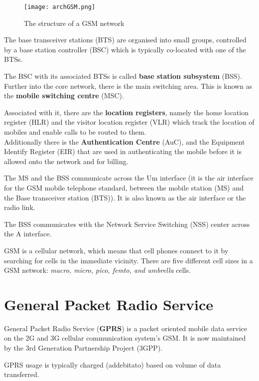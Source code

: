 \begin{figure}[H]
  \centering
  \texttt{[image: archGSM.png]}
  \caption{The structure of a GSM network}
  \label{fig:archGSM}
\end{figure}

The base transceiver stations (BTS) are organised into small groups,
controlled by a base station controller (BSC) which is typically co-located
with one of the BTSs.

The BSC with its associated BTSs is called \textbf{base station subsystem}
(BSS). \\

Further into the core network, there is the main switching area.
This is known as the \textbf{mobile switching centre} (MSC).

Associated with it, there are the \textbf{location registers}, namely the home
location register (HLR) and the visitor location register (VLR) which track
the location of mobiles and enable calls to be routed to them. \\

Additionally there is the \textbf{Authentication Centre} (AuC), and the
Equipment Identify Register (EIR) that are used in authenticating the
mobile before it is allowed onto the network and for billing.

The MS and the BSS communicate across the Um interface (it is the air
interface for the GSM mobile telephone standard, between the mobile station
(MS) and the Base transceiver station (BTS)). It is also known as the air
interface or the radio link.

The BSS communicates with the Network Service Switching (NSS) center across
the A interface.

GSM is a cellular network, which means that cell phones connect to it by
searching for cells in the immediate vicinity. There are five different cell
sizes in a GSM network: \textit{macro, micro, pico, femto, and umbrella} cells.

\section{General Packet Radio Service}
\label{sec:gprs}

General Packet Radio Service (\textbf{GPRS}) is a packet oriented mobile data
service on the 2G and 3G cellular communication system's GSM. It is now
maintained by the 3rd Generation Partnership Project (3GPP).

GPRS usage is typically charged (addebitato) based on volume of data
transferred.

